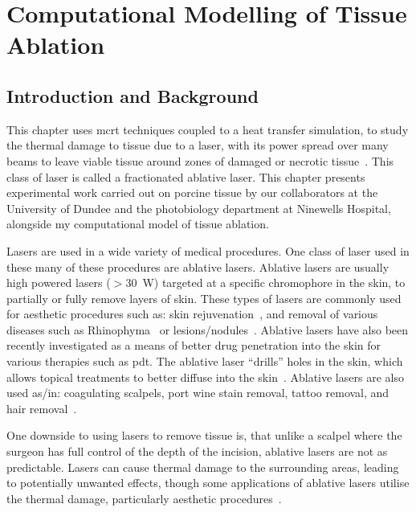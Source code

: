 \chapter{Computational Modelling of Tissue Ablation}
\label{chap:ablation}
\section{Introduction and Background}
\label{sec:intro}

This chapter uses \gls*{mcrt} techniques coupled to a heat transfer simulation, to study the thermal damage to tissue due to a laser, with its power spread over many beams to leave viable tissue around zones of damaged or necrotic tissue~\cite{manstein2004fractional}. This class of laser is called a fractionated ablative laser. This chapter presents experimental work carried out on porcine tissue by our collaborators at the University of Dundee and the photobiology department at Ninewells Hospital, alongside my computational model of tissue ablation.

\medskip

Lasers are used in a wide variety of medical procedures.
One class of laser used in these many of these procedures are ablative lasers. Ablative lasers are usually high powered lasers ($>$30~W) targeted at a specific chromophore in the skin, to partially or fully remove layers of skin. These types of lasers are commonly used for aesthetic procedures such as: skin rejuvenation~\cite{hardaway2002nonablative}, and removal of various diseases such as Rhinophyma~\cite{shapshay1980removal} or lesions/nodules~\cite{valcavi2010percutaneous}. Ablative lasers have also been recently investigated as a means of better drug penetration into the skin for various therapies such as \gls*{pdt}. The ablative laser ``drills'' holes in the skin, which allows topical treatments to better diffuse into the skin~\cite{haedersdal2010fractional}. Ablative lasers are also used as/in: coagulating scalpels, port wine stain removal, tattoo removal, and hair removal~\cite{amini2010ultrafast, tan1989treatment,kuperman2001laser,liew2002laser}.

One downside to using lasers to remove tissue is, that unlike a scalpel where the surgeon has full control of the depth of the incision, ablative lasers are not as predictable. Lasers can cause thermal damage to the surrounding areas, leading to potentially  unwanted effects, though some applications of ablative lasers utilise the thermal damage, particularly aesthetic procedures~\cite{alexiades2008spectrum}.

